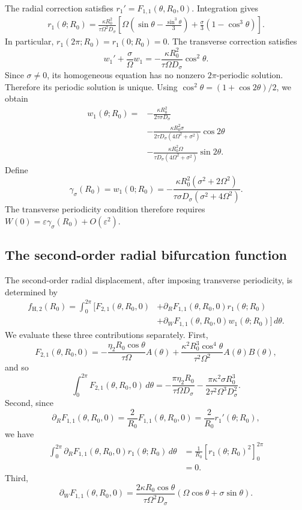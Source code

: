 \documentclass[11pt,reqno]{amsart}
\theoremstyle{plain}
\theoremstyle{definition}
\theoremstyle{remark}
\begin{document}
The radial correction satisfies
$
r_1'=F_{1,1}(\theta,R_0,0).
$
Integration gives
\[
\begin{aligned}
r_1(\theta;R_0)
=
\frac{\kappa R_0^2}{\tau\Omega^2D_\sigma}
\left[
\Omega\left(\sin\theta-\frac{\sin^3\theta}{3}\right)
+\frac{\sigma}{3}(1-\cos^3\theta)
\right].
\end{aligned}
\]
In particular,
$
r_1(2\pi;R_0)=r_1(0;R_0)=0.
$
The transverse correction satisfies
\[
w_1'+\frac{\sigma}{\Omega}w_1
=
-\frac{\kappa R_0^2}{\tau\Omega D_\sigma}\cos^2\theta.
\]
Since $\sigma\neq0$, its homogeneous equation has no
nonzero $2\pi$-periodic solution. Therefore its periodic
solution is unique. Using
$\cos^2\theta=(1+\cos2\theta)/2$, we obtain
\[
\begin{aligned}
w_1(\theta;R_0)
={}&
-\frac{\kappa R_0^2}{2\tau\sigma D_\sigma}\\
&-\frac{\kappa R_0^2\sigma}
{2\tau D_\sigma(4\Omega^2+\sigma^2)}\cos2\theta\\
&-\frac{\kappa R_0^2\Omega}
{\tau D_\sigma(4\Omega^2+\sigma^2)}\sin2\theta.
\end{aligned}
\]
Define
\[
\gamma_\sigma(R_0)
=
w_1(0;R_0)
=
-\frac{\kappa R_0^2(\sigma^2+2\Omega^2)}
{\tau\sigma D_\sigma(\sigma^2+4\Omega^2)}.
\]
The transverse periodicity condition therefore requires
$
W(0)=\varepsilon\gamma_\sigma(R_0)+O(\varepsilon^2).
$

\subsection{The second-order radial bifurcation function}
\label{subsec:classical-second-average}

The second-order radial displacement, after imposing
transverse periodicity, is determined by
\[
\begin{aligned}
f_{\mathrm H,2}(R_0)
=
\int_0^{2\pi}
\Big[
F_{2,1}(\theta,R_0,0)
&+\partial_R F_{1,1}(\theta,R_0,0)
r_1(\theta;R_0)\\
&+\partial_W F_{1,1}(\theta,R_0,0)
w_1(\theta;R_0)
\Big]\,d\theta.
\end{aligned}
\]
We evaluate these three contributions separately.
First,
\[
F_{2,1}(\theta,R_0,0)
=
-\frac{\eta_2R_0\cos\theta}{\tau\Omega}A(\theta)
+\frac{\kappa^2R_0^3\cos^4\theta}
{\tau^2\Omega^2}A(\theta)B(\theta),
\]
and so
\[
\int_0^{2\pi}F_{2,1}(\theta,R_0,0)\,d\theta
=
-\frac{\pi\eta_2R_0}{\tau\Omega D_\sigma}
-\frac{\pi\kappa^2\sigma R_0^3}
{2\tau^2\Omega^3D_\sigma^2}.
\]
Second, since
\[
\partial_R F_{1,1}(\theta,R_0,0)
=
\frac2{R_0}F_{1,1}(\theta,R_0,0)
=
\frac2{R_0}r_1'(\theta;R_0),
\]
we have
\[
\begin{aligned}
\int_0^{2\pi}
\partial_R F_{1,1}(\theta,R_0,0)
r_1(\theta;R_0)\,d\theta
&=
\frac1{R_0}
\left[r_1(\theta;R_0)^2\right]_0^{2\pi}\\
&=0.
\end{aligned}
\]
Third,
\[
\partial_W F_{1,1}(\theta,R_0,0)
=
\frac{2\kappa R_0\cos\theta}
{\tau\Omega^2D_\sigma}
\left(\Omega\cos\theta+\sigma\sin\theta\right).
\]
\end{document}
